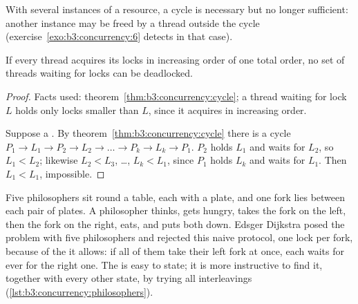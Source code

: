 With several instances of a resource, a cycle is necessary but no longer sufficient: another instance may be freed by a thread outside the cycle (exercise~\ref{exo:b3:concurrency:6} detects  in that case).

\begin{theorem}\label{thm:b3:concurrency:ordering}
If every thread acquires its locks in increasing order of one total order, no set of threads waiting for locks can be deadlocked.
\end{theorem}

\begin{proof}
Facts used: theorem~\ref{thm:b3:concurrency:cycle}; a thread waiting for lock $L$ holds only locks smaller than $L$, since it acquires in increasing order.

Suppose a . By theorem~\ref{thm:b3:concurrency:cycle} there is a cycle $P_1 \to L_1 \to P_2 \to L_2 \to \dots \to P_k \to L_k \to P_1$. $P_2$ holds $L_1$ and waits for $L_2$, so $L_1 < L_2$; likewise $L_2 < L_3$, \dots, $L_k < L_1$, since $P_1$ holds $L_k$ and waits for $L_1$. Then $L_1 < L_1$, impossible.
\end{proof}

Five philosophers sit round a table, each with a plate, and one fork lies between each pair of plates. A philosopher thinks, gets hungry, takes the fork on the left, then the fork on the right, eats, and puts both down. Edsger Dijkstra posed the problem with five philosophers and rejected this naive protocol, one lock per fork, because of the  it allows: if all of them take their left fork at once, each waits for ever for the right one. %
The  is easy to state; it is more instructive to find it, together with every other state, by trying all interleavings (\cref{lst:b3:concurrency:philosophers}).

\label{lst:b3:concurrency:philosophers}

\label{out:b3:concurrency:philosophers}

